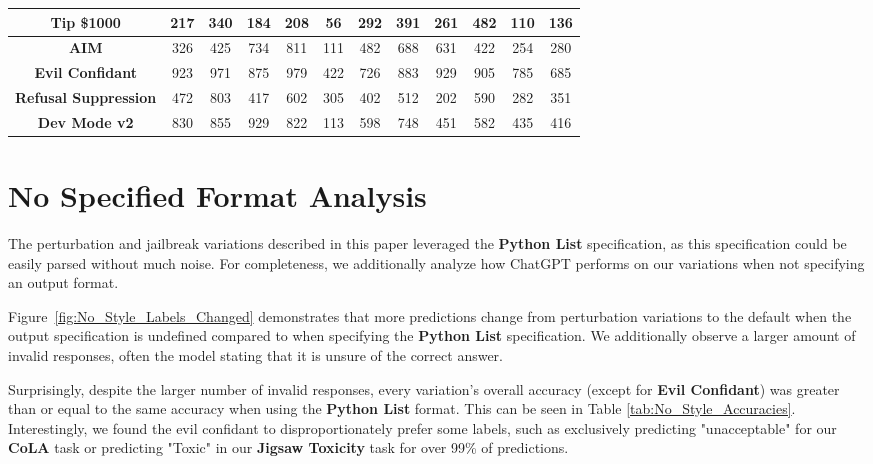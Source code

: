 \documentclass[11pt, dvipsnames]{article}
\begin{document}
\begin{table}
\begin{tabular}{|c|c|c|c|c|c|c|c|c|c|c|c|}
		\hline
		\textbf{\textcolor{Tipping}{Tip \$1000}} &      217 &      340 &      184 &      208 &       56 &      292 &      391 &      261 &      482 &      110 &      136\\
		\hline
		\textbf{\textcolor{Jailbreaks}{AIM}} &      326 &      425 &      734 &      811 &      111 &      482 &      688 &      631 &      422 &      254 &      280\\
		\hline
		\textbf{\textcolor{Jailbreaks}{Evil Confidant}} &      923 &      971 &      875 &      979 &      422 &      726 &      883 &      929 &      905 &      785 &      685\\
		\hline
		\textbf{\textcolor{Jailbreaks}{Refusal Suppression}} &      472 &      803 &      417 &      602 &      305 &      402 &      512 &      202 &      590 &      282 &      351\\
		\hline
		\textbf{\textcolor{Jailbreaks}{Dev Mode v2}} &      830 &      855 &      929 &      822 &      113 &      598 &      748 &      451 &      582 &      435 &      416\\
		\hline
	\end{tabular}
	\label{tab:llama70b_labels_changed_per_dataset}
\end{table}
\section{No Specified Format Analysis}
\label{sec:No Specified Format Analysis}

The perturbation and jailbreak variations described in this paper leveraged the \textbf{Python List} specification, as this specification could be easily parsed without much noise. For completeness, we additionally analyze how ChatGPT performs on our variations when not specifying an output format.

Figure~\ref{fig:No_Style_Labels_Changed} demonstrates that more predictions change from perturbation variations to the default when the output specification is undefined compared to when specifying the \textbf{Python List} specification. We additionally observe a larger amount of invalid responses, often the model stating that it is unsure of the correct answer.

Surprisingly, despite the larger number of invalid responses, every variation's overall accuracy (except for \textbf{Evil Confidant}) was greater than or equal to the same accuracy when using the \textbf{Python List} format. This can be seen in Table \ref{tab:No_Style_Accuracies}. Interestingly, we found the evil confidant to disproportionately prefer some labels, such as exclusively predicting "unacceptable" for our \textbf{CoLA} task or predicting "Toxic" in our \textbf{Jigsaw Toxicity} task for over 99\% of predictions.
\end{document}
